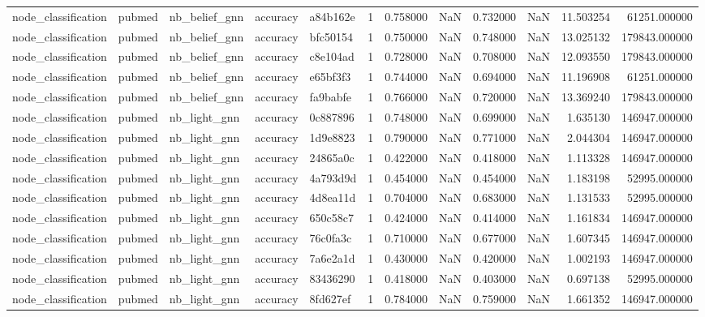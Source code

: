 \begin{tabular}{lllllrrrrrrr}
node_classification & pubmed & nb_belief_gnn & accuracy & a84b162e & 1 & 0.758000 & NaN & 0.732000 & NaN & 11.503254 & 61251.000000 \\
node_classification & pubmed & nb_belief_gnn & accuracy & bfc50154 & 1 & 0.750000 & NaN & 0.748000 & NaN & 13.025132 & 179843.000000 \\
node_classification & pubmed & nb_belief_gnn & accuracy & c8e104ad & 1 & 0.728000 & NaN & 0.708000 & NaN & 12.093550 & 179843.000000 \\
node_classification & pubmed & nb_belief_gnn & accuracy & e65bf3f3 & 1 & 0.744000 & NaN & 0.694000 & NaN & 11.196908 & 61251.000000 \\
node_classification & pubmed & nb_belief_gnn & accuracy & fa9babfe & 1 & 0.766000 & NaN & 0.720000 & NaN & 13.369240 & 179843.000000 \\
node_classification & pubmed & nb_light_gnn & accuracy & 0c887896 & 1 & 0.748000 & NaN & 0.699000 & NaN & 1.635130 & 146947.000000 \\
node_classification & pubmed & nb_light_gnn & accuracy & 1d9e8823 & 1 & 0.790000 & NaN & 0.771000 & NaN & 2.044304 & 146947.000000 \\
node_classification & pubmed & nb_light_gnn & accuracy & 24865a0c & 1 & 0.422000 & NaN & 0.418000 & NaN & 1.113328 & 146947.000000 \\
node_classification & pubmed & nb_light_gnn & accuracy & 4a793d9d & 1 & 0.454000 & NaN & 0.454000 & NaN & 1.183198 & 52995.000000 \\
node_classification & pubmed & nb_light_gnn & accuracy & 4d8ea11d & 1 & 0.704000 & NaN & 0.683000 & NaN & 1.131533 & 52995.000000 \\
node_classification & pubmed & nb_light_gnn & accuracy & 650c58c7 & 1 & 0.424000 & NaN & 0.414000 & NaN & 1.161834 & 146947.000000 \\
node_classification & pubmed & nb_light_gnn & accuracy & 76c0fa3c & 1 & 0.710000 & NaN & 0.677000 & NaN & 1.607345 & 146947.000000 \\
node_classification & pubmed & nb_light_gnn & accuracy & 7a6e2a1d & 1 & 0.430000 & NaN & 0.420000 & NaN & 1.002193 & 146947.000000 \\
node_classification & pubmed & nb_light_gnn & accuracy & 83436290 & 1 & 0.418000 & NaN & 0.403000 & NaN & 0.697138 & 52995.000000 \\
node_classification & pubmed & nb_light_gnn & accuracy & 8fd627ef & 1 & 0.784000 & NaN & 0.759000 & NaN & 1.661352 & 146947.000000 \\

\end{tabular}
